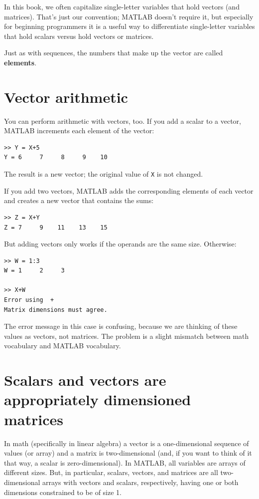 \documentclass[
]{book}
\begin{document}
In this book, we often capitalize single-letter variables that hold vectors 
(and matrices).
That's
just our convention; MATLAB doesn't require it, but especially for beginning
programmers it is a useful way to 
differentiate single-letter variables that hold scalars versus hold vectors or matrices.

Just as with sequences, the numbers that make up the vector are called
{\bf elements}.


\section{Vector arithmetic}

You can perform arithmetic with vectors, too.  If you add a scalar
to a vector, MATLAB increments each element of the vector:

\begin{verbatim}
>> Y = X+5
Y = 6     7     8     9    10
\end{verbatim}

The result is a new vector; the original value of {\tt X} is not
changed.

If you add two vectors, MATLAB adds the corresponding elements of each
vector and creates a new vector that contains the sums:

\begin{verbatim}
>> Z = X+Y
Z = 7     9    11    13    15
\end{verbatim}

But adding vectors only works if the operands are the same size.
Otherwise:

\begin{verbatim}
>> W = 1:3
W = 1     2     3

>> X+W
Error using  +
Matrix dimensions must agree.
\end{verbatim}

The error message in this case is confusing, because we are thinking
of these values as vectors, not matrices.  The problem is a slight
mismatch between math vocabulary and MATLAB vocabulary.


\section{Scalars and vectors are appropriately dimensioned matrices}

In math (specifically in linear algebra) a vector is a one-dimensional
sequence of values (or array) and a matrix is two-dimensional (and, if you want
to think of it that way, a scalar is zero-dimensional).  In MATLAB,
all variables are arrays of different sizes.  But, in particular, 
scalars, vectors, and matrices are all two-dimensional arrays with 
vectors and scalars, respectively, having one or both dimensions 
constrained to be of size 1.
\end{document}
